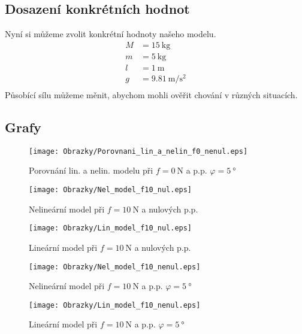 \documentclass[a4paper, 12pt]{article}
\begin{document}
		\subsection{Dosazení konkrétních hodnot}
			Nyní si můžeme zvolit konkrétní hodnoty našeho modelu. 
			\begin{align*}
				M &= \SI{15}{\kilo\gram}\\
				m &= \SI{5}{\kilo\gram}\\
				l &= \SI{1}{\meter}\\
				g &= \SI{9,81}{\meter\per\square\second}\\
			\end{align*}
			Působící sílu můžeme měnit, abychom mohli ověřit chování v různých situacích.
			\newpage
		\subsection{Grafy}
			\begin{figure}[h]
				\begin{center}
					\texttt{[image: Obrazky/Porovnani\_lin\_a\_nelin\_f0\_nenul.eps]}
					\label{Porovnani_lin_a_nelin_f0_nenul}
					\caption{Porovnání lin. a nelin. modelu při $f=\SI{0}{\newton}$ a p.p. $\varphi = \SI{5}{\degree}$}
				\end{center}
			\end{figure}
			\begin{figure}[h]
				\begin{center}
					\texttt{[image: Obrazky/Nel\_model\_f10\_nul.eps]}
					\label{Nel_model_f10_nul}
					\caption{Nelineární model při $f=\SI{10}{\newton}$ a nulových p.p.}
				\end{center}
				\begin{center}
					\texttt{[image: Obrazky/Lin\_model\_f10\_nul.eps]}
					\label{Lin_model_f10_nul}
					\caption{Lineární model při $f=\SI{10}{\newton}$ a nulových p.p.}
				\end{center}
			\end{figure}
			\begin{figure}[h]
				\begin{center}
					\texttt{[image: Obrazky/Nel\_model\_f10\_nenul.eps]}
					\label{Nel_model_f10_nenul}
					\caption{Nelineární model při $f=\SI{10}{\newton}$ a p.p. $\varphi = \SI{5}{\degree}$}
				\end{center}
				\begin{center}
					\texttt{[image: Obrazky/Lin\_model\_f10\_nenul.eps]}
					\label{Lin_model_f10_nenul}
					\caption{Lineární model při $f=\SI{10}{\newton}$ a p.p. $\varphi = \SI{5}{\degree}$}
				\end{center}
			\end{figure}
	\clearpage
\end{document}
